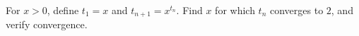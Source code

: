 For $x>0$, define $t_1=x$ and $t_{n+1}=x^{t_n}$. Find $x$ for which $t_n$ converges to $2$, and verify convergence.
